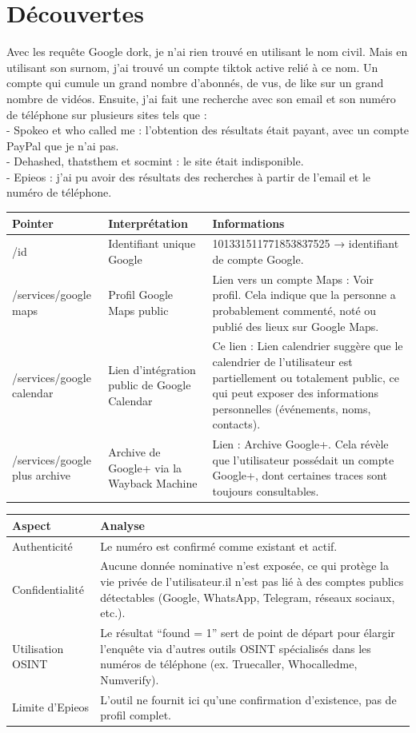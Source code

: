 \documentclass[french]{article}
\begin{document}
\section{Découvertes}
Avec les requête Google dork, je n’ai rien trouvé en utilisant le nom civil. Mais en utilisant son surnom, j’ai trouvé un compte tiktok active relié à ce nom. Un compte qui cumule un grand nombre d’abonnés, de vus, de like sur un grand nombre de vidéos.
Ensuite, j’ai fait une recherche avec son email et son numéro de téléphone sur plusieurs sites tels que :\\ 
  - Spokeo et who called me : l’obtention des résultats était payant, avec un compte PayPal que je n’ai pas.\\
  - Dehashed, thatsthem et socmint : le site était indisponible.\\
  - Epieos : j’ai pu avoir des résultats des recherches à partir de l’email et le numéro de téléphone.\\
\vfill
\begin{tabular}{|l|l|l|}
	\hline
	Pointer & Interprétation & Informations\\
	\hline
	/id & Identifiant unique Google & 101331511771853837525 → identifiant de compte Google.\\
	\hline
	/services/google maps & Profil Google Maps public & Lien vers un compte Maps : Voir profil. Cela indique que la personne a probablement commenté, noté ou publié des lieux sur Google Maps.\\
	\hline
	/services/google calendar & Lien d’intégration public de Google Calendar & Ce lien : Lien calendrier suggère que le calendrier de l’utilisateur est partiellement ou totalement public, ce qui peut exposer des informations personnelles (événements, noms, contacts).\\
	\hline
	/services/google plus archive & Archive de Google+ via la Wayback Machine & Lien : Archive Google+. Cela révèle que l’utilisateur possédait un compte Google+, dont certaines traces sont toujours consultables.\\
	\hline
\end{tabular}
\vfill
\begin{tabular}{|l|l|}
	\hline
	Aspect & Analyse\\
	\hline
	Authenticité & Le numéro est confirmé comme existant et actif.\\
	\hline
	Confidentialité & Aucune donnée nominative n’est exposée, ce qui protège la vie privée de l’utilisateur.il n’est pas lié à des comptes publics détectables (Google, WhatsApp, Telegram, réseaux sociaux, etc.).\\
	\hline
	Utilisation OSINT & Le résultat “found = 1” sert de point de départ pour élargir l’enquête via d’autres outils OSINT spécialisés dans les numéros de téléphone (ex. Truecaller, Whocalledme, Numverify).\\
	\hline
	Limite d’Epieos & L’outil ne fournit ici qu’une confirmation d’existence, pas de profil complet.\\
	\hline
\end{tabular}
\end{document}
